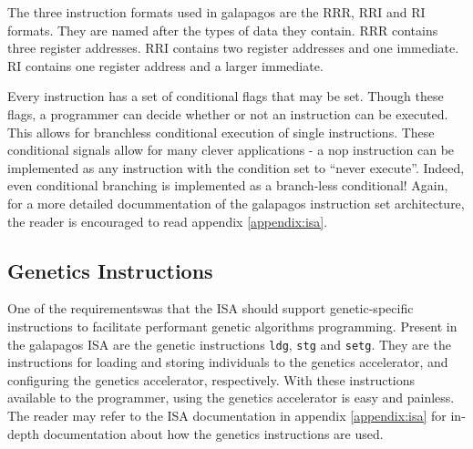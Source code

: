 The three instruction formats used in \Gls{galapagos} are the RRR, RRI and RI formats.
They are named after the types of data they contain.
RRR contains three register addresses.
RRI contains two register addresses and one immediate.
RI contains one register address and a larger immediate.

Every instruction has a set of conditional flags that may be set.
Though these flags, a programmer can decide whether or not an instruction can be executed.
This allows for branchless conditional execution of single instructions.
These conditional signals allow for many clever applications - a \gls{nop} instruction can be implemented as any instruction with the condition set to ``never execute''.
Indeed, even conditional branching is implemented as a branch-less conditional!
Again, for a more detailed docummentation of the \gls{galapagos} instruction set architecture, the reader is encouraged to read appendix \vref{appendix:isa}.


\subsection{Genetics Instructions}

One of the requirements\cn was that the ISA should support genetic-specific instructions to facilitate performant genetic algorithms programming.
Present in the \Gls{galapagos} ISA are the genetic instructions \texttt{ldg}, \texttt{stg} and \texttt{setg}.
They are the instructions for loading and storing \glspl{individual} to the genetics accelerator, and configuring the genetics accelerator, respectively.
With these instructions available to the programmer, using the genetics accelerator is easy and painless.
The reader may refer to the ISA documentation in appendix \vref{appendix:isa} for in-depth documentation about how the genetics instructions are used.

